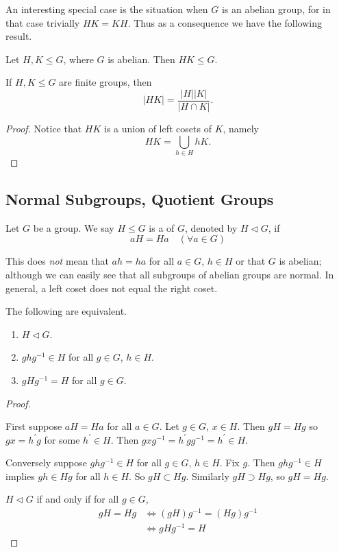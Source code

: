 An interesting special case is the situation when $G$ is an abelian group, for in that case trivially $HK=KH$. Thus as a consequence we have the following result.

\begin{corollary}
Let $H,K\le G$, where $G$ is abelian. Then $HK\le G$.
\end{corollary}

\begin{proposition}
If $H,K\le G$ are finite groups, then
\[|HK|=\frac{|H||K|}{|H\cap K|}.\]
\end{proposition}

\begin{proof}
Notice that $HK$ is a union of left cosets of $K$, namely
\[HK=\bigcup_{h\in H}hK.\]

\end{proof}

\subsection{Normal Subgroups, Quotient Groups}
\begin{definition}
Let $G$ be a group. We say $H\le G$ is a  of $G$, denoted by $H\triangleleft G$, if
\[aH=Ha\quad(\forall a\in G)\]
\end{definition}

\begin{remark}
This does \emph{not} mean that $ah=ha$ for all $a\in G$, $h\in H$ or that $G$ is abelian; although we can easily see that all subgroups of abelian groups are normal. In general, a left coset does not equal the right coset.
\end{remark}

\begin{lemma}
The following are equivalent.
\begin{enumerate}[label=(\roman*)]
\item $H\triangleleft G$.
\item $ghg^{-1}\in H$ for all $g\in G$, $h\in H$.
\item $gHg^{-1}=H$ for all $g\in G$.
\end{enumerate}
\end{lemma}

\begin{proof} \

 First suppose $aH=Ha$ for all $a\in G$. Let $g\in G$, $x\in H$. Then $gH=Hg$ so $gx=h^\prime g$ for some $h^\prime\in H$. Then $gxg^{-1}=h^\prime gg^{-1}=h^\prime\in H$.

Conversely suppose $ghg^{-1}\in H$ for all $g\in G$, $h\in H$. Fix $g$. Then $ghg^{-1}\in H$ implies $gh\in Hg$ for all $h\in H$. So $gH\subset Hg$. Similarly $gH\supset Hg$, so $gH=Hg$.

 $H\triangleleft G$ if and only if for all $g\in G$,
\begin{align*}
gH=Hg&\iff(gH)g^{-1}=(Hg)g^{-1}\\
&\iff gHg^{-1}=H
\end{align*}
\end{proof}

